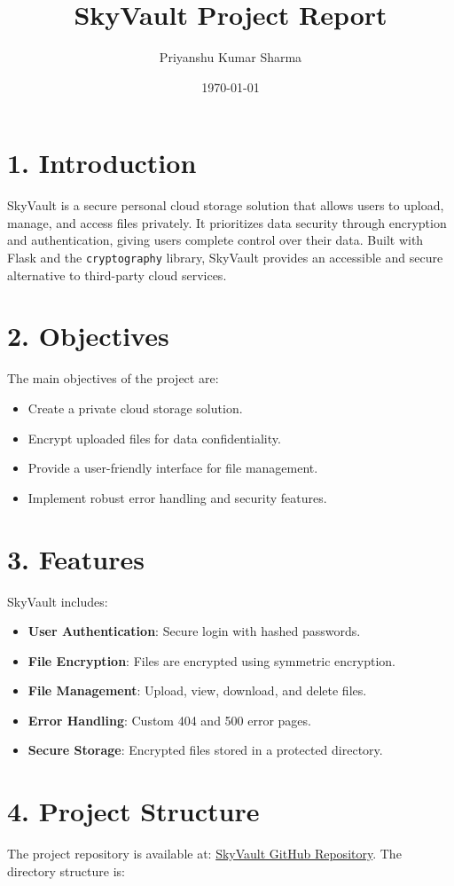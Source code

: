 \documentclass[12pt,a4paper]{article}
\title{\textbf{SkyVault Project Report}}
\author{Priyanshu Kumar Sharma}
\date{\today}
\begin{document}
\maketitle

\section*{1. Introduction}
SkyVault is a secure personal cloud storage solution that allows users to upload, manage, and access files privately. It prioritizes data security through encryption and authentication, giving users complete control over their data. Built with Flask and the \texttt{cryptography} library, SkyVault provides an accessible and secure alternative to third-party cloud services.

\section*{2. Objectives}
The main objectives of the project are:
\begin{itemize}
    \item Create a private cloud storage solution.
    \item Encrypt uploaded files for data confidentiality.
    \item Provide a user-friendly interface for file management.
    \item Implement robust error handling and security features.
\end{itemize}

\section*{3. Features}
SkyVault includes:
\begin{itemize}
    \item \textbf{User Authentication}: Secure login with hashed passwords.
    \item \textbf{File Encryption}: Files are encrypted using symmetric encryption.
    \item \textbf{File Management}: Upload, view, download, and delete files.
    \item \textbf{Error Handling}: Custom 404 and 500 error pages.
    \item \textbf{Secure Storage}: Encrypted files stored in a protected directory.
\end{itemize}

\section*{4. Project Structure}
The project repository is available at: \href{https://github.com/PriyanshuKSharma/SkyVault.git}{SkyVault GitHub Repository}. The directory structure is:
\end{document}
